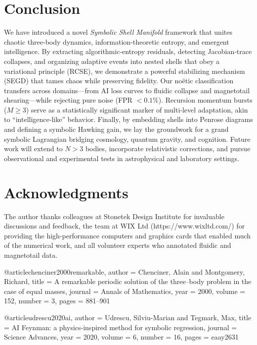 \documentclass[11pt]{article}
\begin{document}
\section{Conclusion}
We have introduced a novel \emph{Symbolic Shell Manifold} framework that unites chaotic three‐body dynamics, information‐theoretic entropy, and emergent intelligence. By extracting algorithmic‐entropy residuals, detecting Jacobian‐trace collapses, and organizing adaptive events into nested shells that obey a variational principle (RCSE), we demonstrate a powerful stabilizing mechanism (SEGD) that tames chaos while preserving fidelity. Our noëtic classification transfers across domains—from AI loss curves to fluidic collapse and magnetotail shearing—while rejecting pure noise (FPR \(<0.1\%\)). Recursion momentum bursts (\(M \ge 3\)) serve as a statistically significant marker of multi‐level adaptation, akin to “intelligence‐like” behavior. Finally, by embedding shells into Penrose diagrams and defining a symbolic Hawking gain, we lay the groundwork for a grand symbolic Lagrangian bridging cosmology, quantum gravity, and cognition. Future work will extend to \(N>3\) bodies, incorporate relativistic corrections, and pursue observational and experimental tests in astrophysical and laboratory settings.

\section*{Acknowledgments}
The author thanks colleagues at Stonetek Design Institute for invaluable discussions and feedback,  
the team at WIX Ltd (https://www.wixltd.com/) for providing the high-performance computers and graphics cards that enabled much of the numerical work, and all volunteer experts who annotated fluidic and magnetotail data.


@article{chenciner2000remarkable,
  author  = {Chenciner, Alain and Montgomery, Richard},
  title   = {A remarkable periodic solution of the three–body problem in the case of equal masses},
  journal = {Annals of Mathematics},
  year    = {2000},
  volume  = {152},
  number  = {3},
  pages   = {881--901}
}

@article{udrescu2020ai,
  author  = {Udrescu, Silviu{-}Marian and Tegmark, Max},
  title   = {{AI Feynman}: a physics-inspired method for symbolic regression},
  journal = {Science Advances},
  year    = {2020},
  volume  = {6},
  number  = {16},
  pages   = {eaay2631}
}
\end{document}
